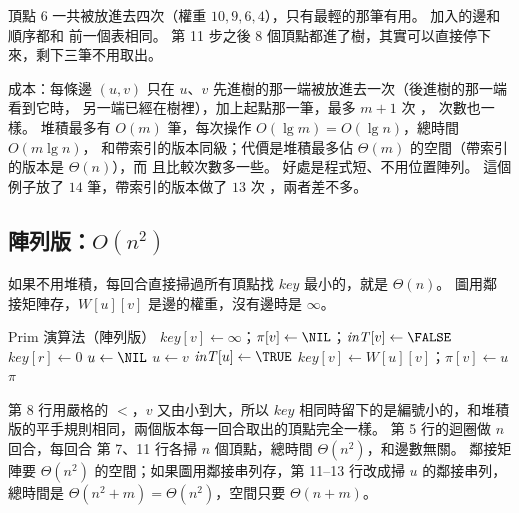 頂點 $6$ 一共被放進去四次（權重 $10, 9, 6, 4$），只有最輕的那筆有用。 加入的邊和順序都和
前一個表相同。 第 11 步之後 $8$ 個頂點都進了樹，其實可以直接停下來，剩下三筆不用取出。

成本：每條邊 $(u, v)$ 只在 $u$、$v$ 先進樹的那一端被放進去一次（後進樹的那一端看到它時，
另一端已經在樹裡），加上起點那一筆，最多 $m + 1$ 次 ，
次數也一樣。 堆積最多有 $O(m)$ 筆，每次操作 $O(\lg m) = O(\lg n)$，總時間 $O(m \lg n)$，
和帶索引的版本同級；代價是堆積最多佔 $\Theta(m)$ 的空間（帶索引的版本是 $\Theta(n)$），而
且比較次數多一些。 好處是程式短、不用位置陣列。 這個例子放了 $14$ 筆，帶索引的版本做了
$13$ 次 ，兩者差不多。

\subsection{陣列版：\texorpdfstring{$O(n^2)$}{O(n²)}}

如果不用堆積，每回合直接掃過所有頂點找 $\mathit{key}$ 最小的，就是 $\Theta(n)$。 圖用鄰
接矩陣存，$W[u][v]$ 是邊的權重，沒有邊時是 $\infty$。

\begin{pseudo}[label=alg:mst-prim-array]{Prim 演算法（陣列版）}
        \State $\mathit{key}[v] \gets \infty$；$\pi[v] \gets \NIL$；$\mathit{inT}[v] \gets \FALSE$
    \EndFor
    \State $\mathit{key}[r] \gets 0$
        \State $u \gets \NIL$
         
                \State $u \gets v$
            \EndIf
        \EndFor
        \State $\mathit{inT}[u] \gets \TRUE$
                \State $\mathit{key}[v] \gets W[u][v]$；$\pi[v] \gets u$
            \EndIf
        \EndFor
    \EndFor
    \State \Return $\pi$
\EndProcedure
\end{pseudo}

第 8 行用嚴格的 $<$，$v$ 又由小到大，所以 $\mathit{key}$ 相同時留下的是編號小的，和堆積
版的平手規則相同，兩個版本每一回合取出的頂點完全一樣。 第 5 行的迴圈做 $n$ 回合，每回合
第 7、11 行各掃 $n$ 個頂點，總時間 $\Theta(n^2)$，和邊數無關。 鄰接矩陣要 $\Theta(n^2)$
的空間；如果圖用鄰接串列存，第 11--13 行改成掃 $u$ 的鄰接串列，總時間是 $\Theta(n^2 + m)
= \Theta(n^2)$，空間只要 $\Theta(n + m)$。

